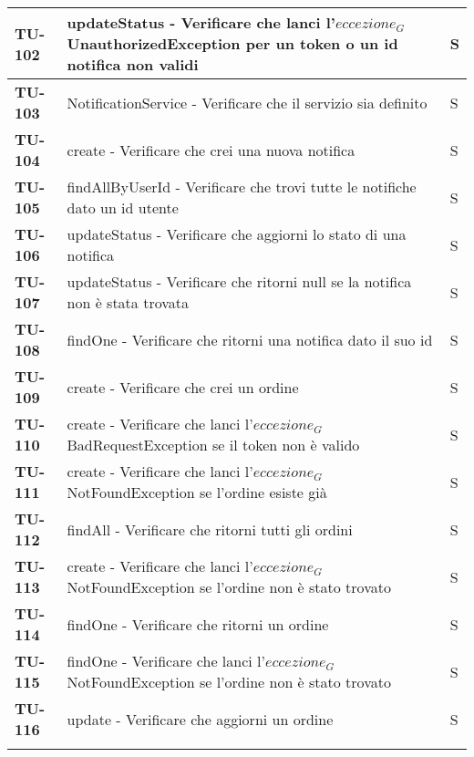 \begin{longtable}{|>{\centering\arraybackslash}p{2cm}|p{15cm}|p{1cm}|}
  \hline
  \rowcolor{gray!10}
  \textbf{TU-102} & updateStatus - Verificare che lanci l'$\textit{eccezione}_G$ UnauthorizedException per un token o un id notifica non validi  & S \\ 
  \hline
  \rowcolor{gray!10}
  \textbf{TU-103} & NotificationService - Verificare che il servizio sia definito  & S \\ 
  \hline
  \rowcolor{gray!10}
  \textbf{TU-104} & create - Verificare che crei una nuova notifica  & S \\ 
  \hline
  \rowcolor{gray!10}
  \textbf{TU-105} & findAllByUserId - Verificare che trovi tutte le notifiche dato un id utente  & S \\ 
  \hline
  \rowcolor{gray!10}
  \textbf{TU-106} & updateStatus - Verificare che aggiorni lo stato di una notifica  & S \\ 
  \hline
  \rowcolor{gray!10}
  \textbf{TU-107} & updateStatus - Verificare che ritorni null se la notifica non è stata trovata  & S \\ 
  \hline
  \rowcolor{gray!10}
  \textbf{TU-108} & findOne - Verificare che ritorni una notifica dato il suo id  & S \\ 
  \hline
  \rowcolor{gray!10}
  \textbf{TU-109} & create - Verificare che crei un ordine  & S \\ 
  \hline
  \rowcolor{gray!10}
  \textbf{TU-110} & create - Verificare che lanci l'$\textit{eccezione}_G$ BadRequestException se il token non è valido  & S \\ 
  \hline
  \rowcolor{gray!10}
  \textbf{TU-111} & create - Verificare che lanci l'$\textit{eccezione}_G$ NotFoundException se l'ordine esiste già  & S \\ 
  \hline
  \rowcolor{gray!10}
  \textbf{TU-112} & findAll - Verificare che ritorni tutti gli ordini  & S \\ 
  \hline
  \rowcolor{gray!10}
  \textbf{TU-113} & create - Verificare che lanci l'$\textit{eccezione}_G$ NotFoundException se l'ordine non è stato trovato  & S \\ 
  \hline
  \rowcolor{gray!10}
  \textbf{TU-114} & findOne - Verificare che ritorni un ordine  & S \\ 
  \hline
  \rowcolor{gray!10}
  \textbf{TU-115} & findOne - Verificare che lanci l'$\textit{eccezione}_G$ NotFoundException se l'ordine non è stato trovato  & S \\ 
  \hline
  \rowcolor{gray!10}
  \textbf{TU-116} & update - Verificare che aggiorni un ordine  & S \\ 
  \hline
  \rowcolor{gray!10}

\end{longtable}
